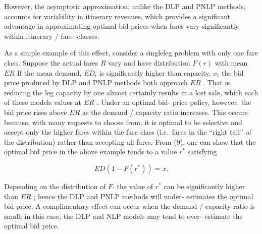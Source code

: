 However, the asymptotic approximation, unlike the DLP and PNLP methods,
accounts for variability in itinerary revenues, which provides a
significant advantage in approximating optimal bid prices when fares
vary significantly within itinerary / fare- classes.

As a simple example of this effect, consider a singleleg problem with
only one fare class. Suppose the actual fares \(R\) vary and have
distribution \(F(r)\) with mean \(ER\) If the mean demand, \(ED_{i}\) is
significantly higher than capacity, \(x_{i}\) the bid price produced by
DLP and PNLP methods both approach \(ER\) . That is, reducing the leg
capacity by one almost certainly results in a lost sale, which each of
these models values at \(ER\) . Under an optimal bid- price policy,
however, the bid price rises above \(ER\) as the demand / capacity ratio
increases. This occurs because, with many requests to choose from, it is
optimal to be selective and accept only the higher fares within the fare
class (i.e.~fares in the ``right tail'' of the distribution) rather than
accepting all fares. From (9), one can show that the optimal bid price
in the above example tends to a value \(r^{*}\) satisfying

\[
ED(1 - F(r^{*})) = x.
\]

Depending on the distribution of \(F_{\prime}\) the value of \(r^{*}\)
can be significantly higher than \(ER\) ; hence the DLP and PNLP methods
will under- estimates the optimal bid price. A complimentary effect can
occur when the demand / capacity ratio is small; in this case, the DLP
and NLP models may tend to over- estimate the optimal bid price.




